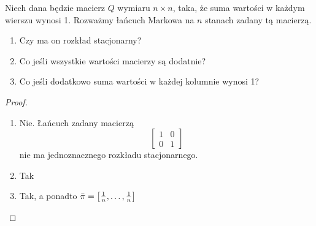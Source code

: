 \begin{exercise}
	Niech dana będzie macierz \( Q \) wymiaru \( n \times n \), taka, że suma wartości w każdym wierszu wynosi 1.
	Rozważmy łańcuch Markowa na \( n \) stanach zadany tą macierzą.

	\begin{enumerate}
		\item Czy ma on rozkład stacjonarny?
		\item Co jeśli wszystkie wartości macierzy są dodatnie?
		\item Co jeśli dodatkowo suma wartości w każdej kolumnie wynosi 1?
	\end{enumerate}
\end{exercise}
\begin{proof}
	\begin{enumerate}
		\item Nie.
		      Łańcuch zadany macierzą
		      \[
			      \begin{bmatrix}
				      1 & 0 \\
				      0 & 1
			      \end{bmatrix}
		      \]
		      nie ma jednoznacznego rozkładu stacjonarnego.

		\item Tak

		\item Tak, a ponadto \( \bar \pi = \left[\frac{1}{n}, \dots, \frac{1}{n}\right] \)
	\end{enumerate}
\end{proof}